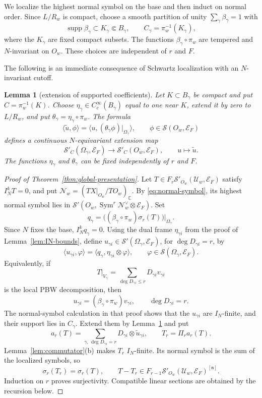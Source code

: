\documentclass[a4paper,12pt]{amsart}
\numberwithin{equation}{section}
\newtheorem{lemma}[theorem]{Lemma}
\theoremstyle{definition}
\theoremstyle{remark}
\newcommand{\C}{\mathbb C}
\newcommand{\fn}{\mathfrak n}
\newcommand{\IN}{I_N}
\newcommand{\mcU}{\mathcal U}
\newcommand{\mcS}{\mathcal S}
\newcommand{\mcE}{\mathcal E}
\newcommand{\Sym}{\operatorname{Sym}}
\newcommand{\supp}{\operatorname{supp}}
\begin{document}
We localize the highest normal symbol on the base and then induct on normal order. Since $L/R_w$ is compact, choose a smooth partition of unity $\sum_\gamma\beta_\gamma=1$ with
\[
 \supp\beta_\gamma\subset K_\gamma\Subset B_\gamma,\qquad
 C_\gamma=\pi_w^{-1}(K_\gamma),
\]
where the $K_\gamma$ are fixed compact subsets. The functions $\beta_\gamma\circ\pi_w$ are tempered and $N$-invariant on $O_w$. These choices are independent of $r$ and $F$.

The following is an immediate consequence of Schwartz localization with an $N$-invariant cutoff.

\begin{lemma}[extension of supported coefficients]\label{lem:coefficient-extension}
Let $K\subset B_\gamma$ be compact and put $C=\pi_w^{-1}(K)$. Choose $\eta_\gamma\in C_c^\infty(B_\gamma)$ equal to one near $K$, extend it by zero to $L/R_w$, and put $\theta_\gamma=\eta_\gamma\circ\pi_w$. The formula
\[
 \langle\widetilde u,\phi\rangle
 =\langle u,(\theta_\gamma\phi)|_{\Omega_\gamma}\rangle,\qquad \phi\in\mcS(O_w,\mcE_F)
\]
defines a continuous $N$-equivariant extension map
\[
 \mcS'_C(\Omega_\gamma,\mcE_F)
 \longrightarrow\mcS'_C(O_w,\mcE_F),\qquad u\mapsto\widetilde u.
\]
The functions $\eta_\gamma$ and $\theta_\gamma$ can be fixed independently of $r$ and $F$.
\end{lemma}

\begin{proof}[Proof of Theorem~\ref{thm:global-presentation}]
Let $T\in F_r\mcS'_{O_w}(\mcU_w,\mcE_F)$ satisfy $\IN^kT=0$, and put $\mathcal N_w=(TX|_{O_w}/TO_w)_\C$. By \eqref{eq:normal-symbol}, its highest normal symbol lies in $\mcS'(O_w,\Sym^r\mathcal N_w^\vee\otimes\mcE_F)$. Set
\[
 q_\gamma=\bigl((\beta_\gamma\circ\pi_w)\sigma_r(T)\bigr)|_{\Omega_\gamma}.
\]
Since $N$ fixes the base, $\IN^kq_\gamma=0$. Using the dual frame $\eta_{\gamma i}$ from the proof of Lemma~\ref{lem:IN-bounds}, define $u_{\gamma i}\in\mcS'(\Omega_\gamma,\mcE_F)$, for $\deg D_{\gamma i}=r$, by
\[
 \langle u_{\gamma i},\varphi\rangle
 =\langle q_\gamma,\eta_{\gamma i}\otimes\varphi\rangle,
 \qquad \varphi\in\mcS(\Omega_\gamma,\mcE_F).
\]
Equivalently, if
\[
 T|_{V_\gamma}=\sum_{\deg D_{\gamma i}\le r}D_{\gamma i}v_{\gamma i}
\]
is the local PBW decomposition, then
\[
 u_{\gamma i}=(\beta_\gamma\circ\pi_w)v_{\gamma i},
 \qquad \deg D_{\gamma i}=r.
\]
The normal-symbol calculation in that proof shows that the $u_{\gamma i}$ are $\IN$-finite, and their support lies in $C_\gamma$. Extend them by Lemma~\ref{lem:coefficient-extension} and put
\[
 a_r(T)=\sum_{\gamma,\,\deg D_{\gamma i}=r}
 D_{\gamma i}\otimes\widetilde u_{\gamma i},
 \qquad T_r=\Pi_ra_r(T).
\]
Lemma~\ref{lem:commutator}(b) makes $T_r$ $\IN$-finite. Its normal symbol is the sum of the localized symbols, so
\[
 \sigma_r(T_r)=\sigma_r(T),\qquad
 T-T_r\in F_{r-1}\mcS'_{O_w}(\mcU_w,\mcE_F)^{[\fn]}.
\]
Induction on $r$ proves surjectivity. Compatible linear sections are obtained by the recursion below.
\end{proof}
\end{document}
